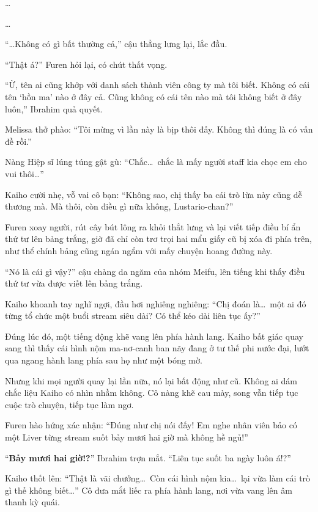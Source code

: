 \documentclass[../main.tex]{subfiles}
\begin{document}
\dots

\dots

``\dots Không có gì bất thường cả,'' cậu thẳng lưng lại, lắc đầu.

``Thật á?'' Furen hỏi lại, có chút thất vọng.

``Ừ, tên ai cũng khớp với danh sách thành viên công ty mà tôi biết. Không có cái tên `hồn ma' nào ở đây cả. Cũng không có cái tên nào mà tôi không biết ở đây luôn,'' Ibrahim quả quyết.

Melissa thở phào: ``Tôi mừng vì lần này là bịp thôi đấy. Không thì đúng là có vấn đề rồi.''

Nàng Hiệp sĩ lúng túng gật gù: ``Chắc\dots\ chắc là mấy người staff kia chọc em cho vui thôi\dots''

Kaiho cười nhẹ, vỗ vai cô bạn: ``Không sao, chị thấy ba cái trò lừa này cũng dễ thương mà. Mà thôi, còn điều gì nữa không, Lustario-chan?''

Furen xoay người, rút cây bút lông ra khỏi thắt lưng và lại viết tiếp điều bí ẩn thứ tư lên bảng trắng, giờ đã chỉ còn trơ trọi hai mẩu giấy cũ bị xóa đi phía trên, như thể chính bảng cũng ngán ngẩm với mấy chuyện hoang đường này.


``Nó là cái gì vậy?'' cậu chàng da ngăm của nhóm Meifu, lên tiếng khi thấy điều thứ tư vừa được viết lên bảng trắng.

Kaiho khoanh tay nghĩ ngợi, đầu hơi nghiêng nghiêng: ``Chị đoán là\dots\ một ai đó từng tổ chức một buổi stream siêu dài? Có thể kéo dài liên tục ấy?''

Đúng lúc đó, một tiếng động khẽ vang lên phía hành lang. Kaiho bất giác quay sang thì thấy cái hình nộm ma-nơ-canh ban nãy đang ở tư thế phi nước đại, lướt qua ngang hành lang phía sau họ như một bóng mờ.


Nhưng khi mọi người quay lại lần nữa, nó lại bất động như cũ. Không ai dám chắc liệu Kaiho có nhìn nhầm không. Cô nàng khẽ cau mày, song vẫn tiếp tục cuộc trò chuyện, tiếp tục làm ngơ.

Furen hào hứng xác nhận: ``Đúng như chị nói đấy! Em nghe nhân viên bảo có một Liver từng stream suốt bảy mươi hai giờ mà không hề ngủ!''

``\textbf{Bảy mươi hai giờ!?}'' Ibrahim trợn mắt. ``Liên tục suốt ba ngày luôn á!?''

Kaiho thốt lên: ``Thật là vãi chưởng\dots\ Còn cái hình nộm kia\dots\ lại vừa làm cái trò gì thế không biết\dots'' Cô đưa mắt liếc ra phía hành lang, nơi vừa vang lên âm thanh kỳ quái.
\end{document}
